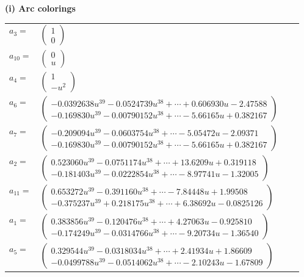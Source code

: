 \documentclass[1p]{elsarticle_modified}
\theoremstyle{definition}
\begin{document}
\flushleft \textbf{(i) Arc colorings}\\
\begin{tabular}{m{7pt} m{180pt} m{7pt} m{180pt} }
\flushright $a_{3}=$&$\begin{pmatrix}1\\0\end{pmatrix}$ \\
\flushright $a_{10}=$&$\begin{pmatrix}0\\u\end{pmatrix}$ \\
\flushright $a_{4}=$&$\begin{pmatrix}1\\- u^2\end{pmatrix}$ \\
\flushright $a_{6}=$&$\begin{pmatrix}-0.0392638 u^{39}-0.0524739 u^{38}+\cdots+0.606930 u-2.47588\\-0.169830 u^{39}-0.00790152 u^{38}+\cdots-5.66165 u+0.382167\end{pmatrix}$ \\
\flushright $a_{7}=$&$\begin{pmatrix}-0.209094 u^{39}-0.0603754 u^{38}+\cdots-5.05472 u-2.09371\\-0.169830 u^{39}-0.00790152 u^{38}+\cdots-5.66165 u+0.382167\end{pmatrix}$ \\
\flushright $a_{2}=$&$\begin{pmatrix}0.523060 u^{39}-0.0751174 u^{38}+\cdots+13.6209 u+0.319118\\-0.181403 u^{39}-0.0222854 u^{38}+\cdots-8.97741 u-1.32005\end{pmatrix}$ \\
\flushright $a_{11}=$&$\begin{pmatrix}0.653272 u^{39}-0.391160 u^{38}+\cdots-7.84448 u+1.99508\\-0.375237 u^{39}+0.218175 u^{38}+\cdots+6.38692 u-0.0825126\end{pmatrix}$ \\
\flushright $a_{1}=$&$\begin{pmatrix}0.383856 u^{39}-0.120476 u^{38}+\cdots+4.27063 u-0.925810\\-0.174249 u^{39}-0.0314766 u^{38}+\cdots-9.20734 u-1.36540\end{pmatrix}$ \\
\flushright $a_{5}=$&$\begin{pmatrix}0.329544 u^{39}-0.0318034 u^{38}+\cdots+2.41934 u+1.86609\\-0.0499788 u^{39}-0.0514062 u^{38}+\cdots-2.10243 u-1.67809\end{pmatrix}$ \\

\end{tabular}
\end{document}
